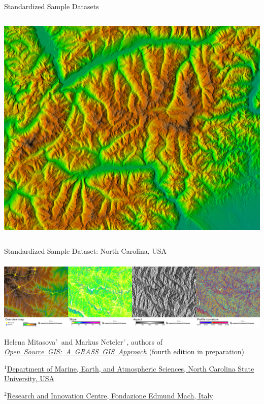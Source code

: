 \documentclass[xcolor={dvipsnames,usenames},beamer,aspectratio=169]{beamer}
\newcommand{\n}[1]{$^{\textcolor{gray}{\mbox{\tiny{#1}}}}$}
\begin{document}
\begin{frame}[fragile]{Standardized Sample Datasets}
\begin{columns}[c]
 \includegraphics[width=\textwidth]{./images/dataset/std_dataset_piemonte_shaded_elevation}%
\end{columns}


\end{frame}



\begin{frame}{Standardized Sample Dataset: North Carolina, USA}

\begin{center}
\includegraphics[width=\textwidth]{./images/dataset/std_dataset_nc_stripe.png}
\end{center}


Helena Mitasova\n{1} and Markus Neteler\n{2}, authors of
\mbox{\href{http://grassbook.org/}{\it Open Source GIS: A GRASS GIS Approach}}
{\scriptsize (fourth edition in preparation)}

\bigskip

{\scriptsize
$^1$\href{http://www.meas.ncsu.edu/}%
{Department of Marine, Earth, and Atmospheric Sciences,
North Carolina State University, USA}

$^2$\href{http://gis.cri.fmach.it/}%
{Research and Innovation Centre, Fondazione Edmund Mach, Italy}
}

\end{frame}
\end{document}
